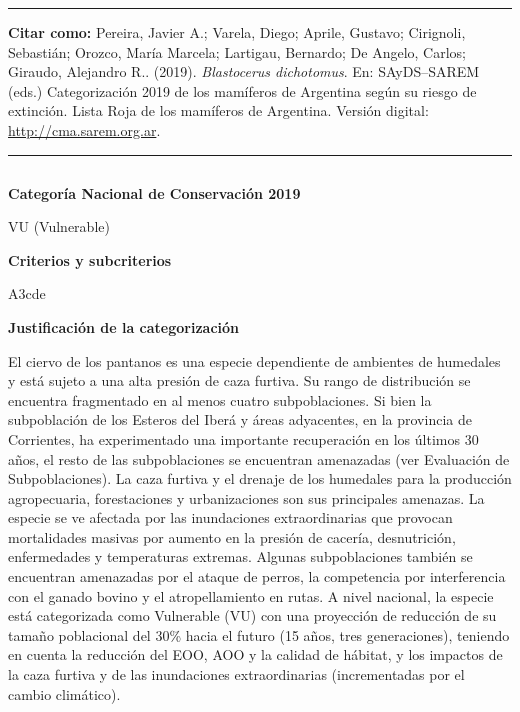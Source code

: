 \documentclass[
  x11names]{article}
\begin{document}
\begin{center}\rule{0.5\linewidth}{0.5pt}\end{center}

\justifying

\textbf{Citar como:} Pereira, Javier A.; Varela, Diego; Aprile, Gustavo;
Cirignoli, Sebastián; Orozco, María Marcela; Lartigau, Bernardo; De
Angelo, Carlos; Giraudo, Alejandro R.. (2019). \emph{Blastocerus
dichotomus}. En: SAyDS--SAREM (eds.) Categorización 2019 de los
mamíferos de Argentina según su riesgo de extinción. Lista Roja de los
mamíferos de Argentina. Versión digital: \url{http://cma.sarem.org.ar}.

\begin{center}\rule{0.5\linewidth}{0.5pt}\end{center}

\newpage

%
\begin{table}[H]
\centering
\begin{tabular}[t]{>{\raggedright\arraybackslash}m{16cm}>{}m{16cm}}
\toprule
\cellcolor{ceil}{\textcolor{white}{\textbf{\rule{0pt}{14pt}CATEGORÍAS DE CONSERVACIÓN}}}\\
\bottomrule
\end{tabular}
\end{table}

\vspace{-0.4cm}

\textbf{Categoría Nacional de Conservación 2019}

VU (Vulnerable)

\textbf{Criterios y subcriterios}

A3cde

\textbf{Justificación de la categorización}

El ciervo de los pantanos es una especie dependiente de ambientes de
humedales y está sujeto a una alta presión de caza furtiva. Su rango de
distribución se encuentra fragmentado en al menos cuatro subpoblaciones.
Si bien la subpoblación de los Esteros del Iberá y áreas adyacentes, en
la provincia de Corrientes, ha experimentado una importante recuperación
en los últimos 30 años, el resto de las subpoblaciones se encuentran
amenazadas (ver Evaluación de Subpoblaciones). La caza furtiva y el
drenaje de los humedales para la producción agropecuaria, forestaciones
y urbanizaciones son sus principales amenazas. La especie se ve afectada
por las inundaciones extraordinarias que provocan mortalidades masivas
por aumento en la presión de cacería, desnutrición, enfermedades y
temperaturas extremas. Algunas subpoblaciones también se encuentran
amenazadas por el ataque de perros, la competencia por interferencia con
el ganado bovino y el atropellamiento en rutas. A nivel nacional, la
especie está categorizada como Vulnerable (VU) con una proyección de
reducción de su tamaño poblacional del 30\% hacia el futuro (15 años,
tres generaciones), teniendo en cuenta la reducción del EOO, AOO y la
calidad de hábitat, y los impactos de la caza furtiva y de las
inundaciones extraordinarias (incrementadas por el cambio climático).
\end{document}
